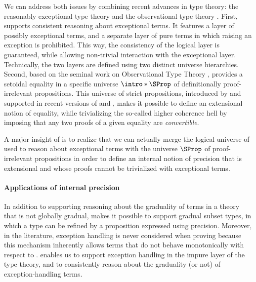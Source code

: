 \AP We can address both issues by combining recent advances in type theory:
the reasonably exceptional type theory  
and the observational type theory  .
First,  supports consistent reasoning about exceptional terms.
It features a layer of possibly exceptional terms,
and a separate layer of pure terms in which raising an exception is prohibited.
This way, the consistency of the logical layer is guaranteed,
while allowing non-trivial interaction with the exceptional layer.
Technically, the two layers are defined using two distinct universe hierarchies.
%
Second, based on the seminal work on Observational Type Theory , 
 provides a setoidal equality in a specific universe $\intro*\SProp$
of definitionally proof-irrelevant propositions. 
This universe of strict propositions, introduced by 
and supported in recent versions of  and , 
makes it possible to define an extensional notion of equality,
while trivializing the so-called higher coherence hell by imposing that any two proofs
of a given equality are \emph{convertible}.

A major insight of  is to realize that we can actually merge
the logical universe of  used to reason about exceptional terms
with the universe $\SProp$ of proof-irrelevant propositions in order to 
define an internal notion of precision that is extensional and whose proofs
cannot be trivialized with exceptional terms.

\paragraph{Applications of internal precision}

In addition to supporting reasoning about the graduality of terms in a theory
that is not globally gradual,  makes it possible
to support gradual subset types, in which a type can be refined
by a proposition expressed using precision.
Moreover, in the literature, exception handling is never considered
when proving  because this mechanism inherently allows terms that
do not behave monotonically with respect to .
 enables us to support exception handling in the impure layer
of the type theory,
and to consistently reason about the graduality (or not) of exception-handling terms.